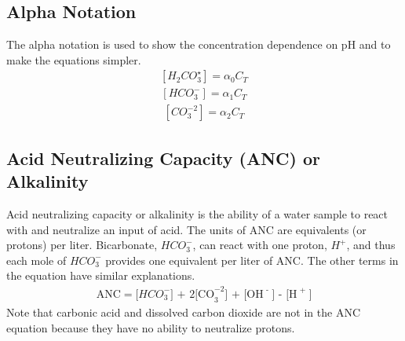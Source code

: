 \documentclass[letterpaper,10pt,english]{sphinxmanual}
\begin{document}
\subsection{Alpha Notation}
\label{\detokenize{Rapid_Mix/RM_Derivations:alpha-notation}}\label{\detokenize{Rapid_Mix/RM_Derivations:heading-alpha-notation}}
The alpha notation is used to show the concentration dependence on pH and to make the equations simpler.
\begin{equation}\label{equation:Rapid_Mix/RM_Derivations:Rapid_Mix/RM_Derivations:6}
\begin{split}\left[ {{H_2}CO_3^{\star} } \right] = {\alpha_0}{C_T}\end{split}
\end{equation}\begin{equation}\label{equation:Rapid_Mix/RM_Derivations:Rapid_Mix/RM_Derivations:7}
\begin{split}\left[ {HCO_3^-} \right] = {\alpha_1}{C_T}\end{split}
\end{equation}\begin{equation}\label{equation:Rapid_Mix/RM_Derivations:Rapid_Mix/RM_Derivations:8}
\begin{split}\left[ {CO_3^{-2}} \right] = {\alpha_2}{C_T}\end{split}
\end{equation}

\subsection{Acid Neutralizing Capacity (ANC) or Alkalinity}
\label{\detokenize{Rapid_Mix/RM_Derivations:acid-neutralizing-capacity-anc-or-alkalinity}}\label{\detokenize{Rapid_Mix/RM_Derivations:heading-acid-neutralizing-capacity-anc-or-alkalinity}}
Acid neutralizing capacity or alkalinity is the ability of a water sample to react with and neutralize an input of acid. The units of ANC are equivalents (or protons) per liter. Bicarbonate, \(HCO_3^-\), can react with one proton, \(H^+\), and thus each mole of \(HCO_3^-\) provides one equivalent per liter of ANC. The other terms in the equation have similar explanations.
\begin{equation}\label{equation:Rapid_Mix/RM_Derivations:Rapid_Mix/RM_Derivations:9}
\begin{split}{\text{ANC}} = [HCO_3^ - {\text{] + 2[CO}}_3^{ - 2}{\text{] + [O}}{{\text{H}}^{\text{ - }}}{\text{] - [}}{{\text{H}}^{\text{ + }}}{\text{]}}\end{split}
\end{equation}
Note that carbonic acid and dissolved carbon dioxide are not in the ANC equation because they have no ability to neutralize protons.
\end{document}
